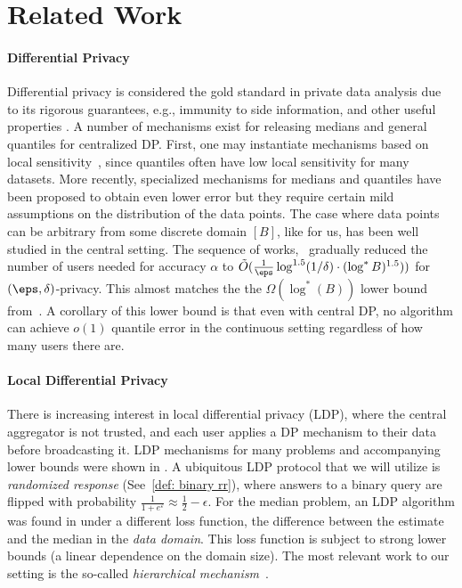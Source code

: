 \section{Related Work}
\label{sec:prior-work}

\paragraph{Differential Privacy} Differential privacy is considered the gold standard in private data analysis due to its rigorous guarantees, e.g., immunity to side information, and other useful properties \cite{dwork2006calibrating, dwork2014algorithmic}. 
A number of mechanisms exist for releasing medians and general quantiles for centralized DP. First, one may instantiate mechanisms based on local sensitivity~\cite{nissim2007smooth, dwork2009differential, asi2020near}, since quantiles often have low local sensitivity for many datasets. More recently, specialized mechanisms for medians \cite{ tzamos2020optimal, drechsler2022nonparametric,aliakbarpour2023differentially} and quantiles \cite{wilson2019differentially, gillenwater2021differentially, alabi2022bounded} have been proposed to obtain even lower error but they require certain mild assumptions on the distribution of the data points.
%
The case where data points can be arbitrary from some discrete domain $[B]$, like for us, has been well studied in the central setting. The sequence of works,~\cite{BeimelNS16twotologstar,Bun2015logstar,Kaplan2020closinggap} gradually reduced the number of users needed for accuracy $\alpha$ to $\tilde O(\frac{1}{\eps}\log^{1.5} (1/\delta)\cdot (\log^*B)^{1.5})
)$ for $(\eps,\delta)$-privacy. This almost matches the the $\Omega(\log^*(B))$ lower bound from~\cite{AlonLMM19}. A corollary of this lower bound is that even with central DP, no algorithm can achieve $o(1)$ quantile error in the continuous setting regardless of how many users there are.
%
\paragraph{Local Differential Privacy} There is increasing interest in local differential privacy (LDP), where the central aggregator is not trusted, and each user applies a DP mechanism to their data before broadcasting it. LDP mechanisms for many problems and accompanying lower bounds were shown in \cite{duchi2013local}. A ubiquitous LDP protocol that we will utilize is \emph{randomized response} (See~\cref{def: binary rr}), where answers to a binary query are flipped with probability $\frac{1}{1+e^\varepsilon} \approx \frac{1}{2}-\epsilon$. For the median problem, an LDP algorithm was found in \cite{duchi2018minimax} under a different loss function, the difference between the estimate and the median in the \emph{data domain}. This loss function is subject to strong lower bounds (a linear dependence on the domain size). %
The most relevant work to our setting is the so-called \emph{hierarchical mechanism}~\cite{kulkarni2019answering}.
%

